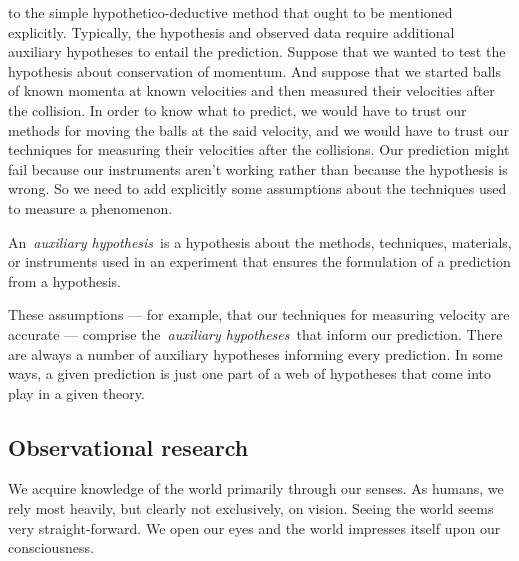 \begin{refsection}
 to the simple hypothetico-deductive method that ought to be mentioned explicitly. Typically, the hypothesis and observed data require additional auxiliary hypotheses to entail the prediction. Suppose that we wanted to test the hypothesis about conservation of momentum. And suppose that we started balls of known momenta at known velocities and then measured their velocities after the collision. In order to know what to predict, we would have to trust our methods for moving the balls at the said velocity, and we would have to trust our techniques for measuring their velocities after the collisions. Our prediction might fail because our instruments aren't working rather than because the hypothesis is wrong. So we need to add explicitly some assumptions about the techniques used to measure a phenomenon.\begin{thesis}\label{thesis:auxiliaryhypothesis}
An \emph{auxiliary hypothesis} is a hypothesis about the methods, techniques, materials, or instruments used in an experiment that ensures the formulation of a prediction from a hypothesis.\end{thesis}

These assumptions --- for example, that our techniques for measuring velocity are accurate --- comprise the \emph{auxiliary hypotheses} that inform our prediction. There are always a number of auxiliary hypotheses informing every prediction. In some ways, a given prediction is just one part of a web of hypotheses that come into play in a given theory.

\subsection{Observational research}
\label{observationalresearch}

We acquire knowledge of the world primarily through our senses. As humans, we rely most heavily, but clearly not exclusively, on vision. Seeing the world seems very straight-forward. We open our eyes and the world impresses itself upon our consciousness.
\begin{marginfigure}
 \begin{center}



\end{center}
\end{marginfigure}
\end{refsection}
